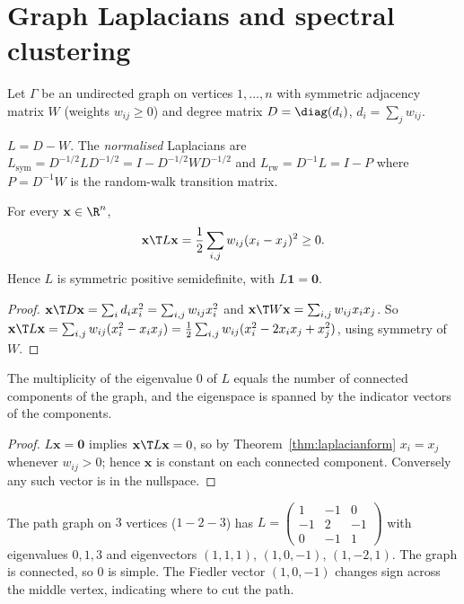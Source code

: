 \section{Graph Laplacians and spectral clustering}

Let $\Gamma$ be an undirected graph on vertices $1,\dots,n$ with symmetric adjacency matrix $W$ (weights $w_{ij}\ge0$) and degree matrix $D=\diag(d_i)$, $d_i=\sum_jw_{ij}$.

\begin{definition}
$L=D-W$. The \emph{normalised} Laplacians are $L_{\mathrm{sym}}=D^{-1/2}LD^{-1/2}=I-D^{-1/2}WD^{-1/2}$ and $L_{\mathrm{rw}}=D^{-1}L=I-P$ where $P=D^{-1}W$ is the random-walk transition matrix.
\end{definition}

\begin{theorem}\label{thm:laplacianform}
For every $\mathbf{x}\in\R^n$,
\[ \mathbf{x}\T L\mathbf{x}=\frac12\sum_{i,j}w_{ij}(x_i-x_j)^2\ge0. \]
Hence $L$ is symmetric positive semidefinite, with $L\mathbf{1}=\mathbf{0}$.
\end{theorem}

\begin{proof}
$\mathbf{x}\T D\mathbf{x}=\sum_id_ix_i^2=\sum_{i,j}w_{ij}x_i^2$ and $\mathbf{x}\T W\mathbf{x}=\sum_{i,j}w_{ij}x_ix_j$. So $\mathbf{x}\T L\mathbf{x}=\sum_{i,j}w_{ij}(x_i^2-x_ix_j)=\tfrac12\sum_{i,j}w_{ij}(x_i^2-2x_ix_j+x_j^2)$, using symmetry of $W$.
\end{proof}

\begin{theorem}\label{thm:components}
The multiplicity of the eigenvalue $0$ of $L$ equals the number of connected components of the graph, and the eigenspace is spanned by the indicator vectors of the components.
\end{theorem}

\begin{proof}
$L\mathbf{x}=\mathbf{0}$ implies $\mathbf{x}\T L\mathbf{x}=0$, so by Theorem~\ref{thm:laplacianform} $x_i=x_j$ whenever $w_{ij}>0$; hence $\mathbf{x}$ is constant on each connected component. Conversely any such vector is in the nullspace.
\end{proof}

\begin{example}
The path graph on $3$ vertices ($1-2-3$) has $L=\begin{pmatrix}1&-1&0\\-1&2&-1\\0&-1&1\end{pmatrix}$ with eigenvalues $0,1,3$ and eigenvectors $(1,1,1)$, $(1,0,-1)$, $(1,-2,1)$. The graph is connected, so $0$ is simple. The Fiedler vector $(1,0,-1)$ changes sign across the middle vertex, indicating where to cut the path.
\end{example}

